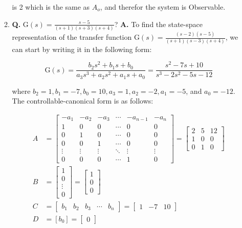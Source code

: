\documentclass[main.tex]{subfiles}
\begin{document}
\begin{enumerate}
\begin{enumerate}
        is 2 which is the same as $A_o$, and therefor the system is Observable.
        
        \item \textbf{Q.} $\mathrm{G}(s)=\frac{s-5}{(s+1)(s+3)(s+4)}$? \textbf{A.} To find the state-space representation of the transfer function $\mathrm{G}(s)=\frac{(s-2)(s-5)}{(s+1)(s-3)(s+4)}$, we can start by writing it in the following form:

        $$
        \mathrm{G}(s)=\frac{b_2 s^2+b_1 s+b_0}{a_3 s^3+a_2 s^2+a_1 s+a_0}=\frac{s^2-7s+10}{s^3-2s^2-5s-12}
        $$
        
        where $b_2=1, b_1=-7, b_0=10, a_3=1, a_2=-2, a_1=-5$, and $a_0=-12$. The controllable-canonical form is as follows:

        $$
        \begin{aligned}
        A &= \left[\begin{array}{cccccc}
        -a_1 & -a_2 & -a_3 & \cdots & -a_{n-1} & -a_n \\
        1 & 0 & 0 & \cdots & 0 & 0 \\
        0 & 1 & 0 & \cdots & 0 & 0 \\
        0 & 0 & 1 & \cdots & 0 & 0 \\
        \vdots & \vdots & \vdots & \ddots & \vdots & \vdots \\
        0 & 0 & 0 & \cdots & 1 & 0
        \end{array}\right] = \left[\begin{array}{ccc}
        2 & 5 & 12 \\
        1 & 0 & 0 \\
        0 & 1 & 0
        \end{array}\right] \\
        B &= \left[\begin{array}{c}
        1 \\
        0 \\
        \vdots \\
        0
        \end{array}\right] = \left[\begin{array}{l}
        1 \\
        0 \\
        0
        \end{array}\right] \\
        C &= \left[\begin{array}{lllll}
        b_1 & b_2 & b_3 & \cdots & b_n
        \end{array}\right] = \left[\begin{array}{lll}
        1 & -7 & 10
        \end{array}\right] \\
        D &= \left[b_0\right] = \left[\begin{array}{ll}
        0
        \end{array}\right]\\
        \end{aligned}
        $$


\end{enumerate}
\end{enumerate}
\end{document}
